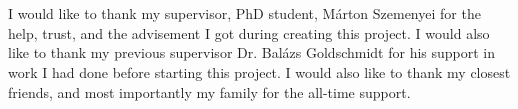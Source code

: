 \chapter*{\koszonetnyilvanitas}

I would like to thank my supervisor, PhD student, Márton Szemenyei for the help,
trust, and the advisement I got during creating this project. I would also like
to thank my previous supervisor Dr. Balázs Goldschmidt for his support in work I
had done before starting this project. I would also like to thank my closest
friends, and most importantly my family for the all-time support.